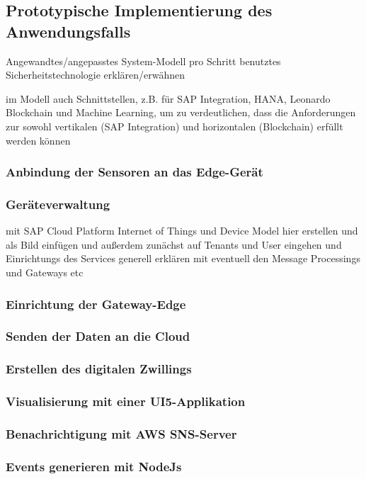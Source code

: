 
\subsection{Prototypische Implementierung des Anwendungsfalls}
Angewandtes/angepasstes System-Modell
pro Schritt benutztes Sicherheitstechnologie erklären/erwähnen

im Modell auch Schnittstellen, z.B. für SAP Integration, HANA, Leonardo Blockchain und Machine Learning, um zu verdeutlichen, dass die Anforderungen zur sowohl vertikalen (SAP Integration) und horizontalen (Blockchain) erfüllt werden können

\subsubsection{Anbindung der Sensoren an das Edge-Gerät}

\subsubsection{Geräteverwaltung}
mit SAP Cloud Platform Internet of Things und Device Model hier erstellen und als Bild einfügen und außerdem
zunächst auf Tenants und User eingehen und Einrichtungs des Services generell erklären mit eventuell den Message Processings
und Gateways etc

\subsubsection{Einrichtung der Gateway-Edge}

\subsubsection{Senden der Daten an die Cloud}

\subsubsection{Erstellen des digitalen Zwillings}

\subsubsection{Visualisierung mit einer UI5-Applikation}

\subsubsection{Benachrichtigung mit AWS SNS-Server}

\subsubsection{Events generieren mit NodeJs}

\newpage
